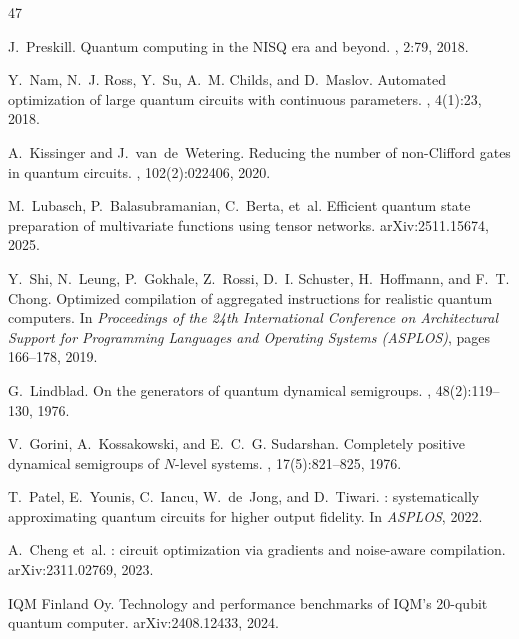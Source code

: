 \documentclass[sigconf,nonacm]{acmart}
\begin{document}
\begin{thebibliography}{47}

J.~Preskill.
\newblock Quantum computing in the {NISQ} era and beyond.
, 2:79, 2018.

Y.~Nam, N.~J. Ross, Y.~Su, A.~M. Childs, and D.~Maslov.
\newblock Automated optimization of large quantum circuits with continuous parameters.
, 4(1):23, 2018.

A.~Kissinger and J.~van~de~Wetering.
\newblock Reducing the number of non-{C}lifford gates in quantum circuits.
, 102(2):022406, 2020.

M.~Lubasch, P.~Balasubramanian, C.~Berta, et~al.
\newblock Efficient quantum state preparation of multivariate functions using tensor networks.
\newblock arXiv:2511.15674, 2025.

Y.~Shi, N.~Leung, P.~Gokhale, Z.~Rossi, D.~I. Schuster, H.~Hoffmann, and F.~T. Chong.
\newblock Optimized compilation of aggregated instructions for realistic quantum computers.
\newblock In {\em Proceedings of the 24th International Conference on Architectural Support for Programming Languages and Operating Systems (ASPLOS)}, pages 166--178, 2019.

G.~Lindblad.
\newblock On the generators of quantum dynamical semigroups.
, 48(2):119--130, 1976.

V.~Gorini, A.~Kossakowski, and E.~C.~G. Sudarshan.
\newblock Completely positive dynamical semigroups of $N$-level systems.
, 17(5):821--825, 1976.

T.~Patel, E.~Younis, C.~Iancu, W.~de~Jong, and D.~Tiwari.
: systematically approximating quantum circuits for higher output fidelity.
\newblock In {\em ASPLOS}, 2022.

A.~Cheng et~al.
: circuit optimization via gradients and noise-aware compilation.
\newblock arXiv:2311.02769, 2023.

{IQM Finland Oy}.
\newblock Technology and performance benchmarks of {IQM}'s 20-qubit quantum computer.
\newblock arXiv:2408.12433, 2024.


\end{thebibliography}
\end{document}
